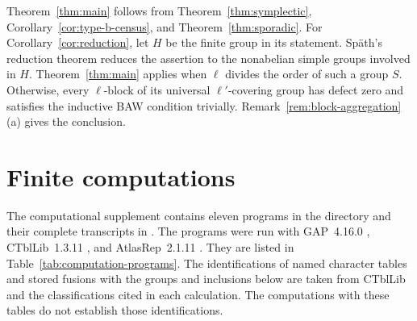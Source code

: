 \documentclass[10pt]{amsart}
\theoremstyle{definition}
\let\oldendproof\endproof
\renewenvironment{proof}[1][\proofname]{%
  \oldproof[\bfseries #1]%
}{\oldendproof}
\newcommand{\GAP}{\textsf{GAP}}
\numberwithin{equation}{section}
\numberwithin{table}{section}
\begin{document}
\begin{proof}
Theorem~\ref{thm:main} follows from Theorem~\ref{thm:symplectic},
Corollary~\ref{cor:type-b-census}, and Theorem~\ref{thm:sporadic}.
For Corollary~\ref{cor:reduction}, let $H$ be the finite group in its
statement. Sp\"ath's reduction theorem
\cite[Theorem~A]{Spath2013} reduces the assertion to the nonabelian
simple groups involved in $H$.
Theorem~\ref{thm:main} applies when $\ell$ divides the order of such a group $S$.
Otherwise, every $\ell$-block of its universal $\ell'$-covering group
has defect zero and satisfies the inductive BAW condition trivially.
Remark~\ref{rem:block-aggregation}\textup{(a)} gives the conclusion.
\end{proof}


\appendix\suppressfloats[t]
\section{Finite computations}\label{app:computation}

The computational supplement contains eleven programs in the directory
 and their complete transcripts in .
The programs were run with \GAP~4.16.0 \cite{GAP2026}, CTblLib~1.3.11
\cite{CTblLib2025}, and AtlasRep~2.1.11 \cite{AtlasRep2026}.
They are listed in Table~\ref{tab:computation-programs}.
The identifications of named character tables and stored fusions with the
groups and inclusions below are taken from CTblLib and the classifications
cited in each calculation. The computations with these tables do not
establish those identifications.
\end{document}
